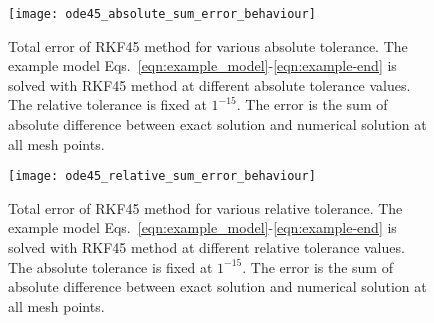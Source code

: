\begin{figure}
    \texttt{[image: ode45\_absolute\_sum\_error\_behaviour]}
    \caption{Total error of RKF45 method for various absolute tolerance. The example model Eqs.~\eqref{eqn:example_model}-\eqref{eqn:example-end} is solved with RKF45 method at different absolute tolerance values. The relative tolerance is fixed at $1^{-15}$. The error is the sum of absolute difference between exact solution and numerical solution at all mesh points.}
    \label{fig:ode45_absolute_sum_error_behaviour}
\end{figure}

\begin{figure}
    \texttt{[image: ode45\_relative\_sum\_error\_behaviour]}
    \caption{Total error of RKF45 method for various relative tolerance. The example model Eqs.~\eqref{eqn:example_model}-\eqref{eqn:example-end} is solved with RKF45 method at different relative tolerance values. The absolute tolerance is fixed at $1^{-15}$. The error is the sum of absolute difference between exact solution and numerical solution at all mesh points.}
    \label{fig:ode45_relative_sum_error_behaviour}
\end{figure}